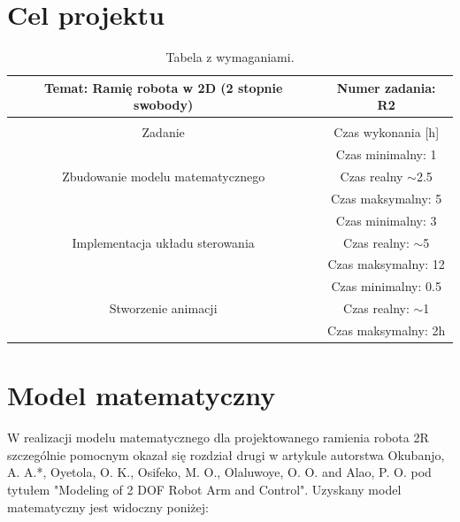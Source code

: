 \documentclass[fleqn,10pt]{physiome}
\begin{document}
\section{Cel projektu}
\begin{table}[ht]
\centering
\begin{tabular}{|c|c|}
\hline
Temat: Ramię robota w 2D (2 stopnie swobody)      & Numer zadania: R2      \\ \hline
\multicolumn{2}{|c|}{}                                                     \\ \hline
Zadanie                                           & Czas wykonania {[}h{]} \\ \hline
\multirow{3}{*}{Zbudowanie modelu matematycznego} & Czas minimalny: 1      \\ \cline{2-2} 
                                                  & Czas realny $\sim$2.5  \\ \cline{2-2} 
                                                  & Czas maksymalny: 5     \\ \hline
\multirow{3}{*}{Implementacja układu sterowania}  & Czas minimalny: 3      \\ \cline{2-2} 
                                                  & Czas realny: $\sim$5   \\ \cline{2-2} 
                                                  & Czas maksymalny: 12    \\ \hline
\multirow{3}{*}{Stworzenie animacji}              & Czas minimalny: 0.5    \\ \cline{2-2} 
                                                  & Czas realny: $\sim$1   \\ \cline{2-2} 
                                                  & Czas maksymalny: 2h    \\ \hline
\end{tabular}
\caption{\label{tab:widgets}Tabela z wymaganiami.}
\end{table}
\newpage
\section{Model matematyczny}

W realizacji modelu matematycznego dla projektowanego ramienia robota 2R szczególnie pomocnym okazał się rozdział drugi w artykule autorstwa Okubanjo, A. A.*, Oyetola, O. K., Osifeko, M. O., Olaluwoye, O. O. and Alao, P. O. pod tytułem "Modeling of 2 DOF Robot Arm and Control". Uzyskany model matematyczny jest widoczny poniżej:
\end{document}

